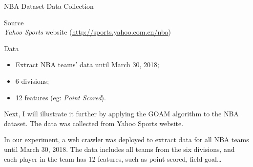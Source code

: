 \documentclass[
size=14pt,
paper=smartboard,  %
mode=present, 		%
display=slides, 	%
style=tuliplab,  	%
pauseslide,
fleqn,leqno]{powerdot}
\begin{document}
\begin{slide}{NBA Dataset}
	Data Collection
	\begin{description}[type=1]
		\item
		Source\\
		\qquad
		\emph{Yahoo Sports} website (\url{http://sports.yahoo.com.cn/nba})
		
		\item
		Data
		
		\begin{itemize}
			\item Extract NBA teams' data until March 30, 2018;
			\item 6 divisions;
			\item 12 features (eg: \emph{Point Scored}).
		\end{itemize}
	\end{description}
	
	\begin{note}
		Next,
		I will illustrate it further by applying the GOAM algorithm to the NBA dataset.
		The data was collected from Yahoo Sports website.
		
		In our experiment,
		a web crawler was deployed to extract data
		for all NBA teams until March 30, 2018.
		The data includes all teams from the six divisions,
		and each player in the team has 12 features,
		such as point scored, field goal\dots
	\end{note}
	
\end{slide}
\end{document}
